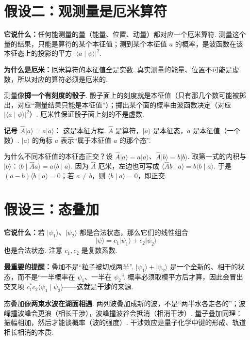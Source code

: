 \documentclass[UTF8,11pt,a4paper,openany]{ctexbook}
\newcommand{\ket}[1]{\lvert #1\rangle}\newcommand{\bra}[1]{\langle #1\rvert}
\newcommand{\braket}[2]{\langle #1\mid #2\rangle}\newcommand{\ii}{\mathrm i}
\newcommand{\term}[1]{\textbf{#1}}
\begin{document}
\section{假设二：观测量是厄米算符}
\textbf{它说什么：}任何能测量的量（能量、位置、动量）都对应一个厄米算符. 测量这个量的结果，只能是算符的某个本征值；测到某个本征值 $a$ 的概率，是波函数在该本征态上的投影的平方 $|\braket a\psi|^2$. 

\textbf{为什么是厄米：}厄米算符的本征值全是实数. 真实测量的能量、位置不可能是虚数，所以对应的算符必须是厄米的. 

\begin{analogybox}
测量像\textbf{掷一个有刻度的骰子}. 骰子面上的刻度就是本征值（只有那几个数可能被掷出，对应“测量结果只能是本征值”）；掷出某个面的概率由波函数决定（对应 $|\braket a\psi|^2$）. 厄米性保证骰子面上刻的不是虚数. 
\end{analogybox}

\begin{notationbox}
\textbf{记号 $\hat A\ket a=a\ket a$：} 这是本征方程. $\hat A$ 是算符，$\ket a$ 是本征态，$a$ 是本征值（一个数）. $\ket a$ 的角标 $a$ 表示“属于本征值 $a$ 的那个态”. 
\end{notationbox}

\begin{derivationbox}为什么不同本征值的本征态正交？设 $\hat A\ket a=a\ket a$、$\hat A\ket b=b\ket b$. 取第一式的内积与 $\ket b$：$\braket b{\hat A a}=a\braket b a$. 因为 $\hat A$ 厄米，左边也可写成 $\braket{\hat A b}a=b\braket b a$. 于是 $(a-b)\braket b a=0$；若 $a\ne b$，则 $\braket b a=0$，即正交. \end{derivationbox}

\section{假设三：态叠加}
\textbf{它说什么：}若 $\ket{\psi_1}$、$\ket{\psi_2}$ 都是合法状态，那么它们的线性组合
\[
\ket\psi=c_1\ket{\psi_1}+c_2\ket{\psi_2}
\]
也是合法状态. 注意 $c_1,c_2$ 是复数系数. 

\textbf{最重要的提醒：}叠加不是“粒子被切成两半”. $\ket{\psi_1}+\ket{\psi_2}$ 是一个全新的、相干的状态，而不是“一半概率在 $\psi_1$、一半在 $\psi_2$”. 概率必须取模平方后才算，因此会冒出交叉项 $c_1^*c_2\braket{\psi_1}{\psi_2}$——这就是\term{干涉}的来源. 

\begin{analogybox}
态叠加像\textbf{两束水波在湖面相遇}. 两列波叠加成新的波，不是“两半水各走各的”；波峰撞波峰会更浪（相长干涉），波峰撞波谷会抵消（相消干涉）. 量子叠加同理：振幅相加，然后才能谈概率（波的强度）. 干涉效应是量子化学中键的形成、轨道相长相消的本质. 
\end{analogybox}
\end{document}

